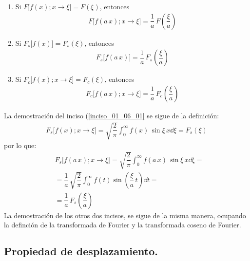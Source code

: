 \begin{enumerate}[\thesubsection .1)]
\item Si $F \big[ f(x); x \to \xi \big] = F(\xi)$, entonces
\begin{align*}
F \big[ f(a \, x); x \to \xi \big] = \dfrac{1}{a} \, F \left( \dfrac{\xi}{a} \right)
\end{align*}
\item \label{inciso_01_06_01} Si $F_{s} \big[f(x)\big] = F_{s}(\xi)$, entonces
\begin{align*}
F_{s} \big[f(a \, x)\big] = \dfrac{1}{a} \, F_{s} \left( \dfrac{\xi}{a} \right)
\end{align*}
\item Si $F_{c} \big[f(x); x \to \xi\big] = F_{c}(\xi)$, entonces
\begin{align*}
F_{c} \big[f(a \, x); x \to \xi \big] = \dfrac{1}{a} \, F_{c} \left( \dfrac{\xi}{a} \right)
\end{align*}
\end{enumerate}
La demostración del inciso (\ref{inciso_01_06_01} se sigue de la definición:
\begin{align*}
F_{s} \big[f(x); x \to \xi \big] = \sqrt{\dfrac{2}{\pi}} \int_{0}^{\infty} f(x) \, \sin \xi \, x \dd{\xi} = F_{s} (\xi)
\end{align*}
por lo que:
\begin{align*}
&F_{s} \big[f(a \, x); x \to \xi \big] = \sqrt{\dfrac{2}{\pi}} \int_{0}^{\infty} f(a \, x) \, \sin \xi \, x \dd{\xi} = \\[0.5em]
&= \dfrac{1}{a} \, \sqrt{\dfrac{2}{\pi}} \int_{0}^{\infty} f(t) \sin \left( \dfrac{\xi}{a} \, t \right) \dd{t} = \\[0.5em]
&= \dfrac{1}{a} \, F_{s} \left( \dfrac{\xi}{a} \right)
\end{align*}
La demostración de los otros dos incisos, se sigue de la misma manera, ocupando la definción de la transformada de Fourier y la transformada coseno de Fourier.

\subsection{Propiedad de desplazamiento.}

